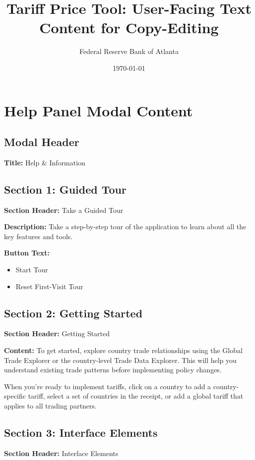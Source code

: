 \documentclass[11pt]{article}
\title{Tariff Price Tool: User-Facing Text Content for Copy-Editing}
\author{Federal Reserve Bank of Atlanta}
\date{\today}
\begin{document}
\maketitle

\section{Help Panel Modal Content}

\subsection{Modal Header}
\textbf{Title:} Help \& Information

\subsection{Section 1: Guided Tour}
\textbf{Section Header:} Take a Guided Tour

\textbf{Description:} Take a step-by-step tour of the application to learn about all the key features and tools.

\textbf{Button Text:}
\begin{itemize}
    \item Start Tour
    \item Reset First-Visit Tour
\end{itemize}

\subsection{Section 2: Getting Started}
\textbf{Section Header:} Getting Started

\textbf{Content:} 
To get started, explore country trade relationships using the Global Trade Explorer or the country-level Trade Data Explorer. This will help you understand existing trade patterns before implementing policy changes.

When you're ready to implement tariffs, click on a country to add a country-specific tariff, select a set of countries in the receipt, or add a global tariff that applies to all trading partners.

\subsection{Section 3: Interface Elements}
\textbf{Section Header:} Interface Elements
\end{document}

